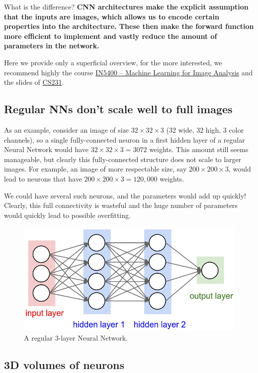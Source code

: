 \documentclass[%
oneside,                 %
final,                   %
10pt]{article}
\begin{document}
What is the difference? \textbf{CNN architectures make the explicit assumption that
the inputs are images, which allows us to encode certain properties
into the architecture. These then make the forward function more
efficient to implement and vastly reduce the amount of parameters in
the network.}

Here we provide only a superficial overview, for the more interested, we recommend highly the course
\href{{https://www.uio.no/studier/emner/matnat/ifi/IN5400/index-eng.html}}{IN5400 – Machine Learning for Image Analysis}
and the slides of \href{{http://cs231n.github.io/convolutional-networks/}}{CS231}.

\subsection{Regular NNs don’t scale well to full images}

As an example, consider
an image of size $32\times 32\times 3$ (32 wide, 32 high, 3 color channels), so a
single fully-connected neuron in a first hidden layer of a regular
Neural Network would have $32\times 32\times 3 = 3072$ weights. This amount still
seems manageable, but clearly this fully-connected structure does not
scale to larger images. For example, an image of more respectable
size, say $200\times 200\times 3$, would lead to neurons that have 
$200\times 200\times 3 = 120,000$ weights. 

We could have
several such neurons, and the parameters would add up quickly! Clearly,
this full connectivity is wasteful and the huge number of parameters
would quickly lead to possible overfitting.


\begin{figure}[!ht]  %
  \centerline{\includegraphics[width=0.6\linewidth]{figslides/nn.jpeg}}
  \caption{
  A regular 3-layer Neural Network.
  }
\end{figure}


\subsection{3D volumes of neurons}
\end{document}
